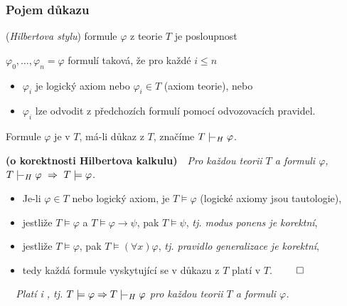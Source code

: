     \subsubsection*{Pojem důkazu}
     (\emph{Hilbertova stylu}) formule $\varphi$ z teorie $T$ je  posloupnost
    \smallskip
    
    $\varphi_0, \dots, \varphi_n=\varphi$ formulí taková, že pro každé $i\le n$
    \smallskip
    
    \begin{itemize}
    \item $\varphi_i$ je logický axiom nebo $\varphi_i \in T$ (axiom teorie), nebo
    \smallskip
    
    \item $\varphi_i$ lze odvodit z předchozích formulí pomocí odvozovacích pravidel.
    \end{itemize}
    \smallskip
    
    Formule $\varphi$ je  v $T$, má-li důkaz z $T$, značíme $T \proves_{H} \varphi$.
    \bigskip
    
    {\bf {} (o korektnosti Hilbertova kalkulu)}\ \ {\it  Pro každou teorii $T$ a formuli $\varphi$,\ \ $T\proves_H \varphi\ \Rightarrow\ T\models \varphi$.}
    \medskip
    
    {\it {}}
    \begin{itemize}
    \item Je-li $\varphi\in T$ nebo logický axiom, je $T \models \varphi$ (logické axiomy jsou tautologie),
    \item jestliže $T \models \varphi$ a $T \models \varphi \to \psi$, pak $T \models \psi$, \emph{tj. modus ponens je korektní},
    \item jestliže $T \models \varphi$, pak $T \models (\forall x)\varphi$, \emph{tj. pravidlo generalizace je korektní},
    \item tedy každá formule vyskytující se v důkazu z $T$ platí v $T$. $\qed$
    \end{itemize}
    \medskip
    
    {\it {}\ \ Platí i , tj. $T\models \varphi \Rightarrow T\proves_H \varphi$ pro každou teorii $T$ a formuli $\varphi$.}
